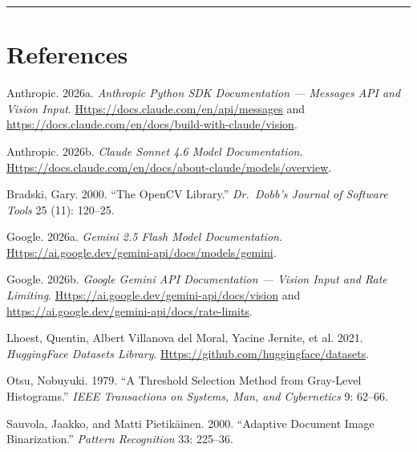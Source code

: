 \documentclass[
  letterpaper,
  DIV=11,
  numbers=noendperiod]{scrartcl}
\newlength{\cslhangindent}
\newenvironment{CSLReferences}[2] %
 {\begin{list}{}{%
  \setlength{\itemindent}{0pt}
  \setlength{\leftmargin}{0pt}
  \setlength{\parsep}{0pt}
  \ifodd #1
   \setlength{\leftmargin}{\cslhangindent}
   \setlength{\itemindent}{-1\cslhangindent}
  \fi
  \setlength{\itemsep}{#2\baselineskip}}}
 {\end{list}}
\begin{document}
\begin{center}\rule{0.5\linewidth}{0.5pt}\end{center}

\section*{References}\label{references}

\protect{}\label{refs}
\begin{CSLReferences}{1}{1}
Anthropic. 2026a. \emph{Anthropic Python {SDK} Documentation ---
Messages API and Vision Input}.
\href{https://docs.claude.com/en/api/messages}{Https://docs.claude.com/en/api/messages}
and \url{https://docs.claude.com/en/docs/build-with-claude/vision}.

Anthropic. 2026b. \emph{{Claude Sonnet 4.6} Model Documentation}.
\href{https://docs.claude.com/en/docs/about-claude/models/overview}{Https://docs.claude.com/en/docs/about-claude/models/overview}.

Bradski, Gary. 2000. {``The {OpenCV} Library.''} \emph{Dr.~Dobb's
Journal of Software Tools} 25 (11): 120--25.

Google. 2026a. \emph{{Gemini 2.5 Flash} Model Documentation}.
\href{https://ai.google.dev/gemini-api/docs/models/gemini}{Https://ai.google.dev/gemini-api/docs/models/gemini}.

Google. 2026b. \emph{Google {Gemini} {API} Documentation --- Vision
Input and Rate Limiting}.
\href{https://ai.google.dev/gemini-api/docs/vision}{Https://ai.google.dev/gemini-api/docs/vision}
and \url{https://ai.google.dev/gemini-api/docs/rate-limits}.

{Lhoest, Quentin, Albert Villanova del Moral, Yacine Jernite, et al.}
2021. \emph{{HuggingFace} Datasets Library}.
\href{https://github.com/huggingface/datasets}{Https://github.com/huggingface/datasets}.

Otsu, Nobuyuki. 1979. {``A Threshold Selection Method from Gray-Level
Histograms.''} \emph{IEEE Transactions on Systems, Man, and Cybernetics}
9: 62--66.

Sauvola, Jaakko, and Matti Pietikäinen. 2000. {``Adaptive Document Image
Binarization.''} \emph{Pattern Recognition} 33: 225--36.


\end{CSLReferences}
\end{document}
